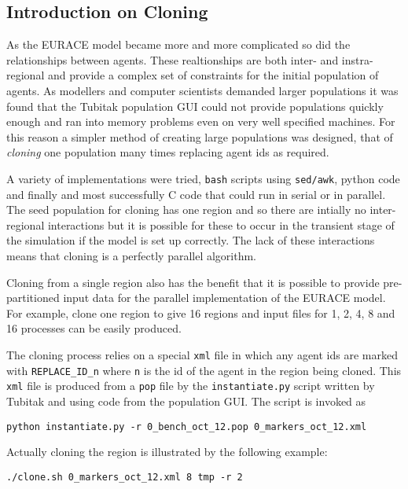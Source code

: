 \subsection{Introduction on Cloning}

As the EURACE model became more and more complicated so did the relationships between agents. These realtionships are both inter- and instra- regional and provide a complex set of constraints for the initial population of agents. As modellers and computer scientists demanded larger populations it was found that the Tubitak population GUI could not provide populations quickly enough and ran into memory problems even on very well specified machines. For this reason a simpler method of creating large populations was designed, that of \textit{cloning} one population many times replacing agent ids as required.

A variety of implementations were tried, \texttt{bash} scripts using \texttt{sed/awk}, python code and finally and most successfully C code that could run in serial or in parallel. The seed population for cloning has one region and so there are intially no inter-regional interactions but it is possible for these to occur in the transient stage of the simulation if the model is set up correctly. The lack of these interactions means that cloning is a perfectly parallel algorithm.

Cloning from a single region also has the benefit that it is possible to provide pre-partitioned input data for the parallel implementation of the EURACE model. For example, clone one region to give 16 regions and input files for 1, 2, 4, 8 and 16 processes can be easily produced.

The cloning process relies on a special \texttt{xml} file in which any agent ids are marked with \texttt{REPLACE\_ID\_n} where \texttt{n} is the id of the agent in the region being cloned. This \texttt{xml} file is produced from a \texttt{pop} file by the \texttt{instantiate.py} script written by Tubitak and using code from the population GUI. The script is invoked as

\begin{verbatim}
python instantiate.py -r 0_bench_oct_12.pop 0_markers_oct_12.xml
\end{verbatim}

Actually cloning the region is illustrated by the following example:

\begin{verbatim}
./clone.sh 0_markers_oct_12.xml 8 tmp -r 2
\end{verbatim}

